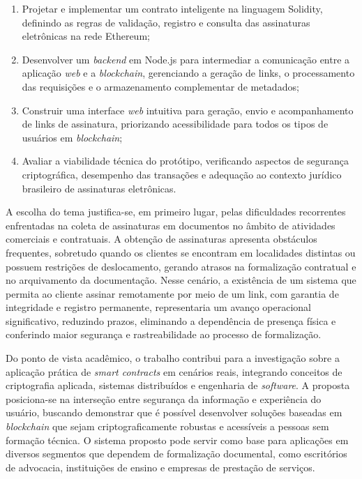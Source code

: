 \documentclass[
    12pt,
    a4paper,
    oneside,
    chapter=TITLE,
    section=TITLE,
    subsection=TITLE,
    subsubsection=TITLE,
    sumario=tradicional,
    english,
    brazil
]{abntex2}
\begin{document}
\begin{enumerate}
    \item Projetar e implementar um contrato inteligente na linguagem
    Solidity, definindo as regras de validação, registro e consulta
    das assinaturas eletrônicas na rede Ethereum;

    \item Desenvolver um \emph{backend} em Node.js para intermediar a
    comunicação entre a aplicação \emph{web} e a \emph{blockchain},
    gerenciando a geração de links, o processamento das requisições e
    o armazenamento complementar de metadados;

    \item Construir uma interface \emph{web} intuitiva para geração,
    envio e acompanhamento de links de assinatura, priorizando
    acessibilidade para todos os tipos de usuários em
    \emph{blockchain};

    \item Avaliar a viabilidade técnica do protótipo, verificando
    aspectos de segurança criptográfica, desempenho das transações e
    adequação ao contexto jurídico brasileiro de assinaturas
    eletrônicas.
\end{enumerate}

A escolha do tema justifica-se, em primeiro lugar, pelas dificuldades
recorrentes enfrentadas na coleta de assinaturas em documentos no
âmbito de atividades comerciais e contratuais. A obtenção de
assinaturas apresenta obstáculos frequentes, sobretudo quando os
clientes se encontram em localidades distintas ou possuem restrições
de deslocamento, gerando atrasos na formalização contratual e no
arquivamento da documentação. Nesse cenário, a existência de um
sistema que permita ao cliente assinar remotamente por meio de um
link, com garantia de integridade e registro permanente,
representaria um avanço operacional significativo, reduzindo prazos,
eliminando a dependência de presença física e conferindo maior
segurança e rastreabilidade ao processo de formalização.

Do ponto de vista acadêmico, o trabalho contribui para a investigação
sobre a aplicação prática de \emph{smart contracts} em cenários
reais, integrando conceitos de criptografia aplicada, sistemas
distribuídos e engenharia de \emph{software}. A proposta
posiciona-se na interseção entre segurança da informação e
experiência do usuário, buscando demonstrar que é possível
desenvolver soluções baseadas em \emph{blockchain} que sejam
criptograficamente robustas e acessíveis a pessoas sem formação
técnica. O sistema proposto pode servir como base para aplicações em
diversos segmentos que dependem de formalização documental, como
escritórios de advocacia, instituições de ensino e empresas de
prestação de serviços.
\end{document}
